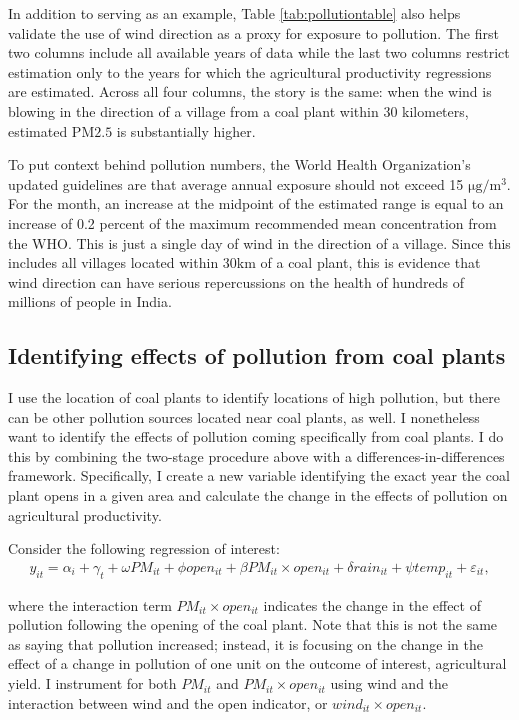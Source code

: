 \documentclass[
]{article}
\begin{document}
In addition to serving as an example, Table \ref{tab:pollutiontable} also helps validate the use of wind direction as a proxy for exposure to pollution. The first two columns include all available years of data while the last two columns restrict estimation only to the years for which the agricultural productivity regressions are estimated. Across all four columns, the story is the same: when the wind is blowing in the direction of a village from a coal plant within 30 kilometers, estimated \(\mathrm{PM 2.5}\) is substantially higher.

To put context behind pollution numbers, the World Health Organization's updated guidelines are that average annual exposure should not exceed 15 \(\mathrm{\mu g/m^3}\). For the month, an increase at the midpoint of the estimated range is equal to an increase of 0.2 percent of the maximum recommended mean concentration from the WHO. This is just a single day of wind in the direction of a village. Since this includes all villages located within 30km of a coal plant, this is evidence that wind direction can have serious repercussions on the health of hundreds of millions of people in India.

\hypertarget{identifying-effects-of-pollution-from-coal-plants}{%
\subsection{Identifying effects of pollution from coal plants}\label{identifying-effects-of-pollution-from-coal-plants}}

I use the location of coal plants to identify locations of high pollution, but there can be other pollution sources located near coal plants, as well. I nonetheless want to identify the effects of pollution coming specifically from coal plants. I do this by combining the two-stage procedure above with a differences-in-differences framework. Specifically, I create a new variable identifying the exact year the coal plant opens in a given area and calculate the change in the effects of pollution on agricultural productivity.

Consider the following regression of interest:
\begin{gather} 
y_{it} = \alpha_{i} + \gamma_{t} + \omega PM_{it} + \phi open_{it} + \beta PM_{it}\times open_{it} + \delta rain_{it} + \psi temp_{it} + \varepsilon_{it},
\end{gather}

where the interaction term \(PM_{it}\times open_{it}\) indicates the change in the effect of pollution following the opening of the coal plant. Note that this is not the same as saying that pollution increased; instead, it is focusing on the change in the effect of a change in pollution of one unit on the outcome of interest, agricultural yield. I instrument for both \(PM_{it}\) and \(PM_{it}\times open_{it}\) using wind and the interaction between wind and the open indicator, or \(wind_{it}\times open_{it}\).
\end{document}
